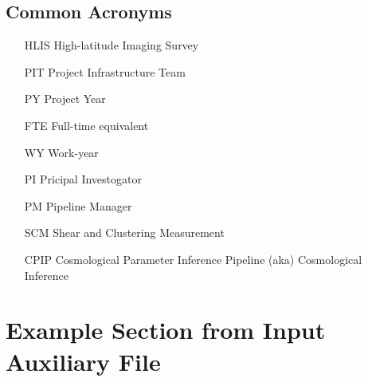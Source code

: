 \documentclass{article}
\begin{document}
\subsection{Common Acronyms}

\begin{itemize}
    \item[HLIS] High-latitude Imaging Survey
    \item[PIT] Project Infrastructure Team
    \item[PY] Project Year
    \item[FTE] Full-time equivalent
    \item[WY] Work-year
    \item[PI] Pricipal Investogator
    \item[PM] Pipeline Manager
    \item[SCM] Shear and Clustering Measurement
    \item[CPIP] Cosmological Parameter Inference Pipeline (aka) Cosmological Inference
\end{itemize}

\newpage
\section{Example Section from Input Auxiliary File}
\label{sec:eg}


\newpage


\end{document}

